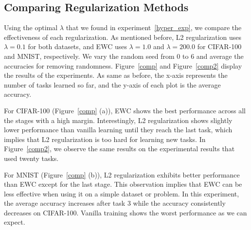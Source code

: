 \documentclass[final]{cvpr}
\begin{document}
\subsection{Comparing Regularization Methods}
Using the optimal $\lambda$ that we found in experiment~\ref{hyper_exp}, we compare the effectiveness of each regularization. As mentioned before, L2 regularization uses $\lambda=0.1$ for both datasets, and EWC uses $\lambda=1.0$ and $\lambda=200.0$ for CIFAR-100 and MNIST, respectively. We vary the random seed from 0 to 6 and average the accuracies for removing randomness. Figure~\ref{comp} and Figure~\ref{comp2} display the results of the experiments. As same as before, the x-axis represents the number of tasks learned so far, and the y-axis of each plot is the average accuracy.

For CIFAR-100 (Figure~\ref{comp} (a)), EWC shows the best performance across all the stages with a high margin. Interestingly, L2 regularization shows slightly lower performance than vanilla learning until they reach the last task, which implies that L2 regularization is too hard for learning new tasks. In Figure~\ref{comp2}, we observe the same results on the experimental results that used twenty tasks.

For MNIST (Figure~\ref{comp} (b)), L2 regularization exhibits better performance than EWC except for the last stage. This observation implies that EWC can be less effective when using it on a simple dataset or problem. In this experiment, the average accuracy increases after task 3 while the accuracy consistently decreases on CIFAR-100. Vanilla training shows the worst performance as we can expect.
\end{document}
